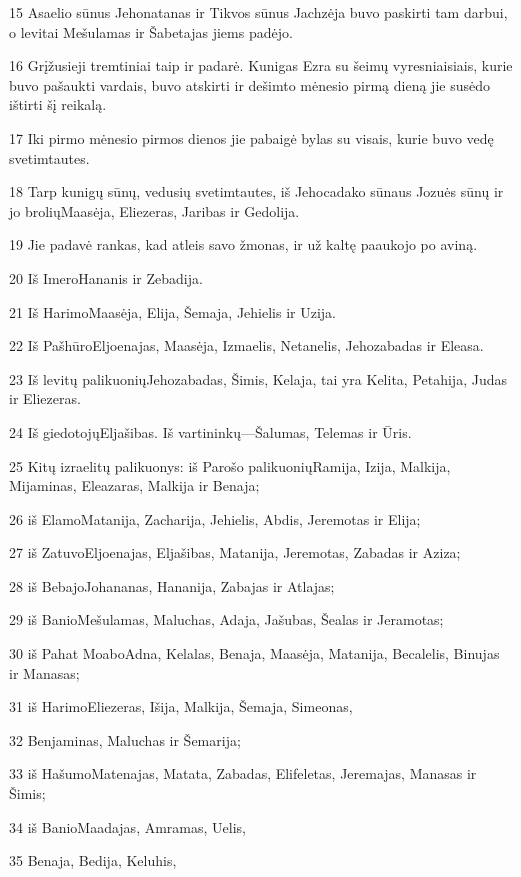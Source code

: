 \par 15 Asaelio sūnus Jehonatanas ir Tikvos sūnus Jachzėja buvo paskirti tam darbui, o levitai Mešulamas ir Šabetajas jiems padėjo. 
\par 16 Grįžusieji tremtiniai taip ir padarė. Kunigas Ezra su šeimų vyresniaisiais, kurie buvo pašaukti vardais, buvo atskirti ir dešimto mėnesio pirmą dieną jie susėdo ištirti šį reikalą. 
\par 17 Iki pirmo mėnesio pirmos dienos jie pabaigė bylas su visais, kurie buvo vedę svetimtautes. 
\par 18 Tarp kunigų sūnų, vedusių svetimtautes, iš Jehocadako sūnaus Jozuės sūnų ir jo brolių­Maasėja, Eliezeras, Jaribas ir Gedolija. 
\par 19 Jie padavė rankas, kad atleis savo žmonas, ir už kaltę paaukojo po aviną. 
\par 20 Iš Imero­Hananis ir Zebadija. 
\par 21 Iš Harimo­Maasėja, Elija, Šemaja, Jehielis ir Uzija. 
\par 22 Iš Pašhūro­Eljoenajas, Maasėja, Izmaelis, Netanelis, Jehozabadas ir Eleasa. 
\par 23 Iš levitų palikuonių­Jehozabadas, Šimis, Kelaja, tai yra Kelita, Petahija, Judas ir Eliezeras. 
\par 24 Iš giedotojų­Eljašibas. Iš vartininkų—Šalumas, Telemas ir Ūris. 
\par 25 Kitų izraelitų palikuonys: iš Parošo palikuonių­Ramija, Izija, Malkija, Mijaminas, Eleazaras, Malkija ir Benaja; 
\par 26 iš Elamo­Matanija, Zacharija, Jehielis, Abdis, Jeremotas ir Elija; 
\par 27 iš Zatuvo­Eljoenajas, Eljašibas, Matanija, Jeremotas, Zabadas ir Aziza; 
\par 28 iš Bebajo­Johananas, Hananija, Zabajas ir Atlajas; 
\par 29 iš Banio­Mešulamas, Maluchas, Adaja, Jašubas, Šealas ir Jeramotas; 
\par 30 iš Pahat Moabo­Adna, Kelalas, Benaja, Maasėja, Matanija, Becalelis, Binujas ir Manasas; 
\par 31 iš Harimo­Eliezeras, Išija, Malkija, Šemaja, Simeonas, 
\par 32 Benjaminas, Maluchas ir Šemarija; 
\par 33 iš Hašumo­Matenajas, Matata, Zabadas, Elifeletas, Jeremajas, Manasas ir Šimis; 
\par 34 iš Banio­Maadajas, Amramas, Uelis, 
\par 35 Benaja, Bedija, Keluhis, 
